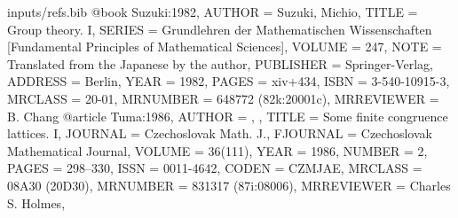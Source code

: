 \begin{filecontents*}{inputs/refs.bib}
  @book {Suzuki:1982,
    AUTHOR = {Suzuki, Michio},
    TITLE = {Group theory. {I}},
    SERIES = {{G}rundlehren der {M}athematischen {W}issenschaften [{F}undamental
        {P}rinciples of {M}athematical {S}ciences]},
    VOLUME = {247},
    NOTE = {Translated from the Japanese by the author},
    PUBLISHER = {Springer-Verlag},
    ADDRESS = {Berlin},
    YEAR = {1982},
    PAGES = {xiv+434},
    ISBN = {3-540-10915-3},
    MRCLASS = {20-01},
    MRNUMBER = {648772 (82k:20001c)},
    MRREVIEWER = {B. Chang}
  }
  @article {Tuma:1986,
    AUTHOR = {\Tuma, \Jiri},
    TITLE = {Some finite congruence lattices. {I}},
    JOURNAL = {Czechoslovak Math. J.},
    FJOURNAL = {Czechoslovak Mathematical Journal},
    VOLUME = {36(111)},
    YEAR = {1986},
    NUMBER = {2},
    PAGES = {298--330},
    ISSN = {0011-4642},
    CODEN = {CZMJAE},
    MRCLASS = {08A30 (20D30)},
    MRNUMBER = {831317 (87i:08006)},
    MRREVIEWER = {Charles S. Holmes},
  }
\end{filecontents*}



\documentclass{au}

 \presentedby{\dots}
 \received{\dots}{\dots}



\usepackage{amsmath,amssymb,url,mathrsfs,enumerate,ifthen,xspace}
\usepackage{latexsym,amscd,amsthm,stmaryrd,scalefnt,color}
\usepackage{tikz}
\usetikzlibrary{calc}
\usepackage[colorlinks=true,urlcolor=black,linkcolor=black,citecolor=black]{hyperref}


\theoremstyle{plain}
\newtheorem{theorem}{Theorem}[section]
\newtheorem{lemma}[theorem]{Lemma}
\newtheorem{proposition}[theorem]{Proposition}
\newtheorem{corollary}[theorem]{Corollary}
\theoremstyle{definition}
\newtheorem{definition}[theorem]{Definition}
\newtheorem{notation}[theorem]{Notation}
\newtheorem{remark}[theorem]{Remark}
\newtheorem{example}[theorem]{Example}
\newtheorem*{remarks}{Remarks}


